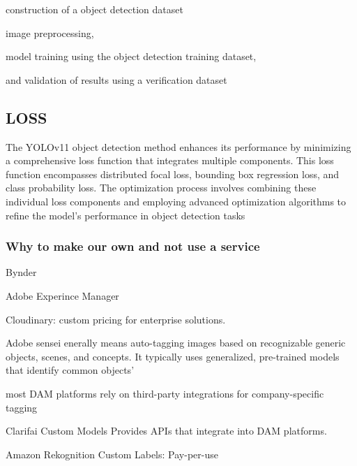 \documentclass[a4paper,10pt,twocolumn]{article}
\numberwithin{figure}{section}
\numberwithin{table}{section}
\begin{document}
construction of a object detection dataset

image preprocessing, 

model training using the object detection training dataset,

and validation of results using a verification dataset


\subsection{\mbox{LOSS}}

The YOLOv11 object detection method enhances its performance by minimizing a comprehensive loss function that integrates multiple components. This loss function encompasses
distributed focal loss, bounding box regression loss, and class
probability loss. The optimization process involves combining
these individual loss components and employing advanced
optimization algorithms to refine the model’s performance
in object detection tasks





\vspace{0.3cm}
\subsubsection{Why to make our own and not use a service}
\vspace{0.3cm}


Bynder


Adobe Experince Manager 

Cloudinary:  custom pricing for enterprise solutions.

Adobe sensei 
enerally means auto-tagging images based on recognizable 
generic objects, scenes, and concepts. It typically uses 
generalized, pre-trained models that identify common objects'

most DAM platforms rely on third-party integrations 
for company-specific tagging


Clarifai Custom Models
Provides APIs that integrate into DAM platforms.


Amazon Rekognition Custom Labels: Pay-per-use
\end{document}
